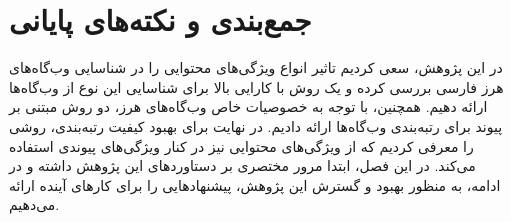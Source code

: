 \documentclass[twoside, a4paper,11pt]{book}
\numberwithin{equation}{chapter}
\numberwithin{table}{chapter}
\numberwithin{figure}{chapter}
\numberwithin{equation}{chapter}
\begin{document}
\chapter{جمع‌بندی و نکته‌های پایانی}
\label{chapter:conclusion}
\thispagestyle{plain}
در این پژوهش، سعی کردیم تاثیر انواع ویژگی‌های محتوایی را در شناسایی وب‌گاه‌های هرز فارسی بررسی کرده و یک روش با کارایی بالا برای شناسایی این نوع از وب‌گاه‌ها ارائه دهیم. همچنین، با توجه به خصوصیات خاص وب‌گاه‌های هرز، دو روش مبتنی بر پیوند برای رتبه‌بندی وب‌گاه‌ها ارائه دادیم. در نهایت برای بهبود کیفیت رتبه‌بندی، روشی را معرفی کردیم که از ویژگی‌های محتوایی نیز در کنار ویژگی‌های پیوندی استفاده می‌کند. در این فصل، ابتدا مرور مختصری بر دستاوردهای این پژوهش داشته و در ادامه، به منظور بهبود و گسترش این پژوهش، پیشنهادهایی را برای کارهای آینده ارائه می‌دهیم. 



\newpage
\thispagestyle{empty}
\mbox{}

\linespread{1}


\small{

\renewcommand{\bibname}{مراجع}
\clearpage

}

\newpage
\thispagestyle{empty}
\mbox{}
\begin{multicols}{2}
\begin{doublespace}

\printglossary[type=latin]

\newpage
\thispagestyle{empty}
\mbox{}

\clearpage
{}
\printglossary[type=persian]
\end{doublespace}
\end{multicols}
\end{document}
